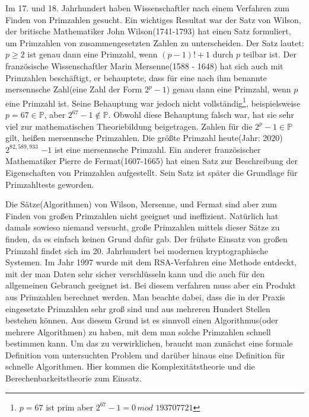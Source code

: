 \documentclass[12pt,oneside]{article}
\theoremstyle{remark}
\theoremstyle{definition}
\begin{document}
Im 17. und 18. Jahrhundert haben Wissenschaftler nach einem Verfahren zum Finden von Primzahlen gesucht. Ein wichtiges Resultat war der Satz von Wilson, der britische Mathematiker John Wilson(1741-1793) hat einen Satz formuliert, um Primzahlen von zusammengesetzten Zahlen zu unterscheiden. Der Satz lautet: $p \geq 2$ ist genau dann eine Primzahl, wenn $(p - 1)! + 1$ durch $p$ teilbar ist. Der französische Wissenschaftler Marin Mersenne(1588 - 1648) hat sich auch mit Primzahlen beschäftigt, er behauptete, dass für eine nach ihm benannte mersennsche Zahl(eine Zahl der Form $2^p - 1$) genau dann eine Primzahl, wenn $p$ eine Primzahl ist. Seine Behauptung war jedoch nicht vollständig\footnote{$p = 67$ ist prim aber $2^{67} - 1 = 0 \, mod \, \, 193707721$}, beispielsweise $ p = 67 \in \mathbb{P}$, aber $2^{67} - 1 \not \in \mathbb{P}$. Obwohl diese Behauptung falsch war, hat sie sehr viel zur mathematischen Theoriebildung beigetragen. Zahlen für die $2^p - 1 \in \mathbb{P}$ gilt, heißen mersennsche Primzahlen. Die größte Primzahl heute(Jahr: 2020) $2^{82,589,933}$ $ - 1$ ist eine mersennsche Primzahl\cite{largePrimes}. Ein anderer französischer Mathematiker Pierre de Fermat(1607-1665) hat einen Satz zur Beschreibung der Eigenschaften von Primzahlen aufgestellt. Sein Satz ist später die Grundlage für Primzahltests geworden.
\newline

Die Sätze(Algorithmen) von Wilson, Mersenne, und Fermat sind aber zum Finden von großen Primzahlen nicht geeignet und ineffizient. Natürlich hat damals sowieso niemand versucht, große Primzahlen mittels dieser Sätze zu finden, da es einfach keinen Grund dafür gab. Der frühste Einsatz von großen Primzahl findet sich im 20. Jahrhundert bei modernen kryptographische Systemen\cite{krypWiki}. Im Jahr 1997 wurde mit dem RSA-Verfahren eine Methode entdeckt, mit der man Daten sehr sicher verschlüsseln kann und die auch für den allgemeinen Gebrauch geeignet ist. Bei diesem verfahren muss aber ein Produkt aus Primzahlen berechnet werden\cite{rsa}. Man beachte dabei, dass die in der Praxis eingesetzte Primzahlen sehr groß sind und aus mehreren Hundert Stellen bestehen können. Aus diesem Grund ist es sinnvoll einen Algorithmus(oder mehrere Algorithmen) zu haben, mit dem man solche Primzahlen \textquotedbl schnell\textquotedbl   $\;$ bestimmen kann. Um das zu verwirklichen, braucht man zunächst eine formale Definition vom untersuchten Problem und darüber hinaus eine Definition für schnelle Algorithmen. Hier kommen die Komplexitätstheorie und die Berechenbarkeitstheorie zum Einsatz. 
\end{document}
